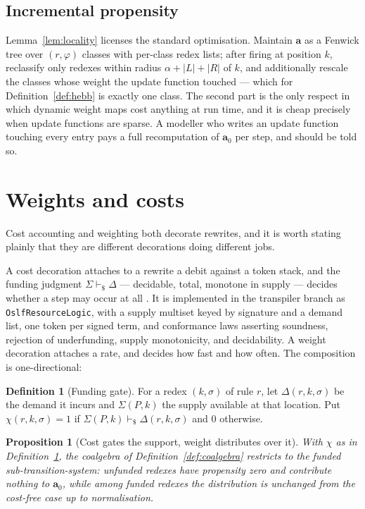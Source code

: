 \documentclass[11pt,a4paper]{article}
\theoremstyle{plain}
\newtheorem{proposition}[theorem]{Proposition}
\theoremstyle{definition}
\newtheorem{definition}[theorem]{Definition}
\theoremstyle{remark}
\newcommand{\prop}{\mathbf{a}}
\newcommand{\funds}{\mathrel{\vdash_{\!\$}}}
\begin{document}
\subsection{Incremental propensity}
\label{sec:incremental}

Lemma~\ref{lem:locality} licenses the standard optimisation. Maintain $\prop$ as a Fenwick tree over
$(r,\varphi)$ classes with per-class redex lists; after firing at position $k$, reclassify only
redexes within radius $\alpha + |L| + |R|$ of $k$, and additionally rescale the classes whose weight
the update function touched --- which for Definition~\ref{def:hebb} is exactly one class. The second
part is the only respect in which dynamic weight maps cost anything at run time, and it is cheap
precisely when update functions are sparse. A modeller who writes an update function touching every
entry pays a full recomputation of $\prop_0$ per step, and should be told so.

\section{Weights and costs}
\label{sec:cost}

Cost accounting and weighting both decorate rewrites, and it is worth stating plainly that they are
different decorations doing different jobs.

A cost decoration attaches to a rewrite a debit against a token stack, and the funding judgment
$\Sigma \funds \Delta$ --- decidable, total, monotone in supply --- decides whether a step may occur
at all \cite{costmonad}. It is implemented in the transpiler branch as
\texttt{OslfResourceLogic}, with a supply multiset keyed by signature and a demand list, one token
per signed term, and conformance laws asserting soundness, rejection of underfunding, supply
monotonicity, and decidability. A weight decoration attaches a rate, and decides how fast and how
often. The composition is one-directional:

\begin{definition}[Funding gate]
\label{def:gate}
For a redex $(k,\sigma)$ of rule $r$, let $\Delta(r,k,\sigma)$ be the demand it incurs and
$\Sigma(P,k)$ the supply available at that location. Put
$\chi(r,k,\sigma) = 1$ if $\Sigma(P,k) \funds \Delta(r,k,\sigma)$ and $0$ otherwise.
\end{definition}

\begin{proposition}[Cost gates the support, weight distributes over it]
\label{prop:gate}
With $\chi$ as in Definition~\ref{def:gate}, the coalgebra of Definition~\ref{def:coalgebra}
restricts to the funded sub-transition-system: unfunded redexes have propensity zero and contribute
nothing to $\prop_0$, while among funded redexes the distribution is unchanged from the
cost-free case up to normalisation.
\end{proposition}
\end{document}
